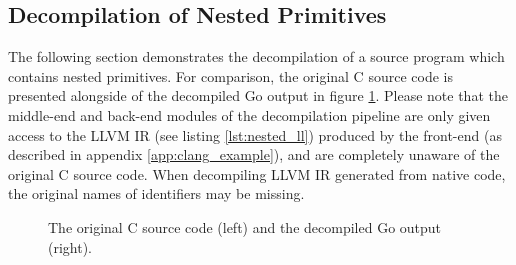 
\subsection{Decompilation of Nested Primitives}

The following section demonstrates the decompilation of a source program which contains nested primitives. For comparison, the original C source code is presented alongside of the decompiled Go output in figure \ref{fig:nested_comparison}. Please note that the middle-end and back-end modules of the decompilation pipeline are only given access to the LLVM IR (see listing \ref{lst:nested_ll}) produced by the front-end (as described in appendix \ref{app:clang_example}), and are completely unaware of the original C source code. When decompiling LLVM IR generated from native code, the original names of identifiers may be missing.

\begin{figure}[htbp]
	\centering
	\begin{subfigure}[t]{0.49\textwidth}
		
	\end{subfigure}
	\qquad
	\begin{subfigure}[t]{0.45\textwidth}
		
	\end{subfigure}
	\caption{The original C source code (left) and the decompiled Go output (right).}
	\label{fig:nested_comparison}
\end{figure}


